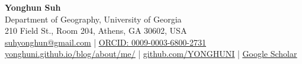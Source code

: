 \documentclass[letterpaper,MMMyyyy,nonstopmode]{simpleresumecv}
\newcommand{\CVWebpage}{https://yonghuni.github.io/blog/about/me/}
\newcommand{\CVGithub}{https://github.com/YONGHUNI}
\newcommand{\CVOrcid}{https://orcid.org/0009-0003-6800-2731}
\begin{document}

\begin{center}
{\LARGE\bfseries Yonghun Suh}\\[5pt]
Department of Geography, University of Georgia\\
210 Field St., Room 204, Athens, GA 30602, USA\\[4pt]
{\small
\href{mailto:suhyonghun@gmail.com}{\underline{suhyonghun@gmail.com}}
\quad|\quad
\href{\CVOrcid}{\underline{ORCID: 0009-0003-6800-2731}}\\[2pt]
\href{\CVWebpage}{\underline{yonghuni.github.io/blog/about/me/}}
\quad|\quad
\href{\CVGithub}{\underline{github.com/YONGHUNI}}
\quad|\quad
\href{https://scholar.google.com/citations?user=Le1ODbgAAAAJ}{\underline{Google Scholar}}
}
\end{center}
\end{document}
